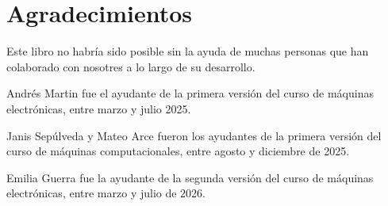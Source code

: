 \documentclass[../principal.tex]{subfiles}
\begin{document}

\chapter{Agradecimientos}

Este libro no habría sido posible sin la ayuda de muchas personas que han colaborado con nosotres a lo largo de su desarrollo.

Andrés Martin fue el ayudante de la primera versión del curso de máquinas electrónicas, entre marzo y julio 2025.

Janis Sepúlveda y Mateo Arce fueron los ayudantes de la primera versión del curso de máquinas computacionales, entre agosto y diciembre de 2025.

Emilia Guerra fue la ayudante de la segunda versión del curso de máquinas electrónicas, entre marzo y julio de 2026.

\newpage
\end{document}
